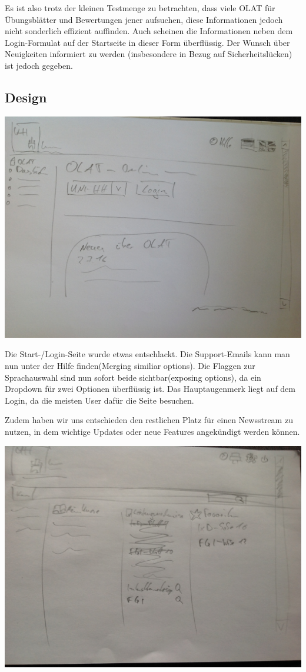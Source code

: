 \documentclass[a4paper,10pt]{article}
\begin{document}
Es ist also trotz der kleinen Testmenge zu betrachten, dass viele OLAT für Übungsblätter und Bewertungen jener aufsuchen, diese Informationen jedoch nicht sonderlich effizient auffinden.
Auch scheinen die Informationen neben dem Login-Formulat auf der Startseite in dieser Form überflüssig. Der Wunsch über Neuigkeiten informiert zu werden (insbesondere in Bezug auf Sicherheitslücken) ist jedoch gegeben.

\subsection{Design}

\includegraphics[scale=0.18]{images/IMG_0362.JPG}

Die Start-/Login-Seite wurde etwas entschlackt. Die Support-Emails kann man nun unter der Hilfe finden(Merging similiar options). Die Flaggen zur Sprachauswahl sind nun sofort beide sichtbar(exposing options), da ein Dropdown für zwei Optionen überflüssig ist. Das Hauptaugenmerk liegt auf dem Login, da die meisten User dafür die Seite besuchen.

Zudem haben wir uns entschieden den restlichen Platz für einen Newsstream zu nutzen, in dem wichtige Updates oder neue Features angekündigt werden können.


\includegraphics[scale=0.18]{images/IMG_0363.JPG}
\end{document}
